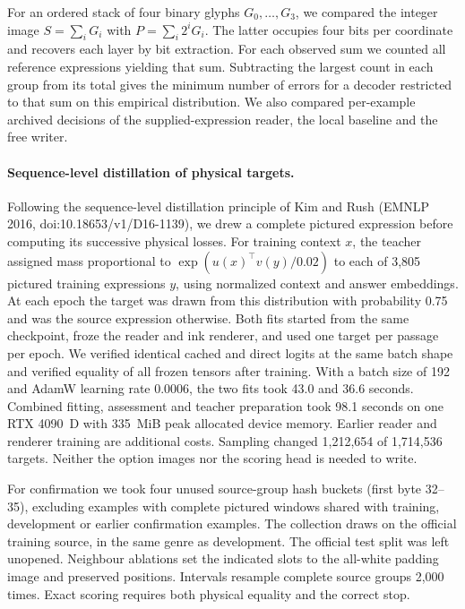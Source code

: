\documentclass[12pt,a4paper]{article}
\providecommand{\DIFadd}[1]{{\protect\color{blue} \sf #1}} %
\begin{document}
\DIFadd{For an ordered stack of four binary glyphs $G_0,\ldots,G_3$, we compared
the integer image $S=\sum_i G_i$ with $P=\sum_i2^iG_i$. The latter
occupies four bits per coordinate and recovers each layer by bit extraction.
For each observed sum we counted all reference expressions yielding that
sum. Subtracting the largest count in each group from its total gives the
minimum number of errors for a decoder restricted to that sum on this
empirical distribution. We also compared per-example archived decisions
of the supplied-expression reader, the local baseline and the free writer.
}

\paragraph{\DIFadd{Sequence-level distillation of physical targets.}}
\DIFadd{Following the sequence-level distillation principle of Kim and Rush
(EMNLP 2016, doi:10.18653/v1/D16-1139), we drew a complete pictured
expression before computing its successive physical losses. For training
context $x$, the teacher assigned mass proportional to
$\exp(u(x)^\top v(y)/0.02)$ to each of 3,805 pictured training expressions
$y$, using normalized context and answer embeddings. At each epoch the
target was drawn from this distribution with probability 0.75 and was
the source expression otherwise. Both fits started from the same
checkpoint, froze the reader and ink renderer, and used one target per
passage per epoch. We verified identical cached and direct logits at
the same batch shape and verified equality of all frozen tensors after
training. With a batch size of 192 and AdamW learning rate 0.0006, the
two fits took 43.0 and 36.6 seconds. Combined fitting, assessment and
teacher preparation took 98.1 seconds on one RTX 4090~D with 335~MiB
peak allocated device memory. Earlier reader and renderer training are
additional costs. Sampling changed 1,212,654 of 1,714,536 targets.
Neither the option images nor the scoring head is needed to write.
}

\DIFadd{For confirmation we took four unused source-group hash buckets (first
byte 32--35), excluding examples with complete pictured windows shared
with training, development or earlier confirmation examples. The
collection draws on the official training source, in the same genre
as development. The official test split was left unopened. Neighbour
ablations set the indicated slots to the all-white padding image and
preserved positions. Intervals resample complete source groups 2,000
times. Exact scoring requires both physical equality and the correct stop.
}
\end{document}
